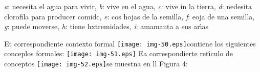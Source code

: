 \documentclass[12pt]{article}
\begin{document}
\textit{a}: necesita el agua para vivir, \textit{b}: vive en el agua,
\textit{c}: vive in la tierra, \textit{d}: nedesita clorofila para producer
comidc, \textit{e}: cos hojas de la semilla, \textit{f}: eoja de una semilla,
\textit{g}: puede moverse, \textit{h}: tiene hxtremidades, \textit{i}: amamanta a
sus ar\'{\i}as

Et correspondiente contexto formal
\texttt{[image: img-50.eps]}contiene los siguientes conceplos
formales:
\texttt{[image: img-51.eps]}
Ea correspondierte ret\'{\i}culo de conceptos
\texttt{[image: img-52.eps]}se muestna en ll Figura 4:
\end{document}
